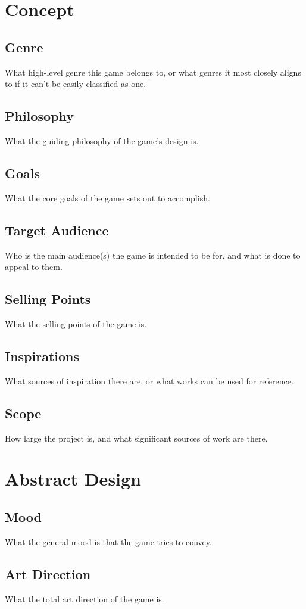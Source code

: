


\section{Concept}
\subsection{Genre}
What high-level genre this game belongs to, or what genres it most closely aligns to if it can't be easily classified as one.
\subsection{Philosophy}
What the guiding philosophy of the game's design is.
\subsection{Goals}
What the core goals of the game sets out to accomplish.
\subsection{Target Audience}
Who is the main audience(s) the game is intended to be for, and what is done to appeal to them.
\subsection{Selling Points}
What the selling points of the game is.
\subsection{Inspirations}
What sources of inspiration there are, or what works can be used for reference.
\subsection{Scope}
How large the project is, and what significant sources of work are there.

\section{Abstract Design}
\subsection{Mood}
What the general mood is that the game tries to convey.
\subsection{Art Direction}
What the total art direction of the game is.
